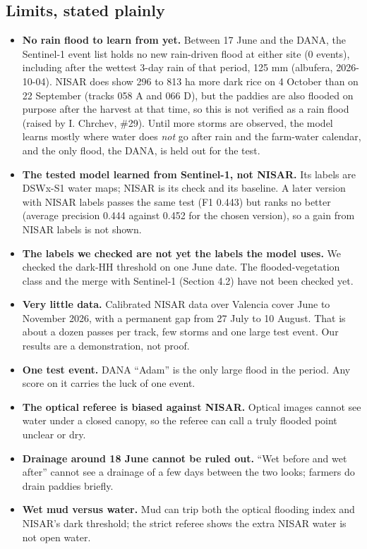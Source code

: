 \documentclass[10pt,twocolumn]{article}
\begin{document}
\subsection{Limits, stated plainly}
\begin{itemize}
\item{} \textbf{No rain flood to learn from yet.} Between 17 June and the DANA, the Sentinel-1 event list holds no new rain-driven flood at either site (0 events), including after the wettest 3-day rain of that period, 125 mm (albufera, 2026-10-04). NISAR does show 296 to 813 ha more dark rice on 4 October than on 22 September (tracks 058 A and 066 D), but the paddies are also flooded on purpose after the harvest at that time, so this is not verified as a rain flood (raised by I. Chrchev, \#29). Until more storms are observed, the model learns mostly where water does \emph{not} go after rain and the farm-water calendar, and the only flood, the DANA, is held out for the test.
\item{} \textbf{The tested model learned from Sentinel-1, not NISAR.} Its labels are DSWx-S1 water maps; NISAR is its check and its baseline. A later version with NISAR labels passes the same test (F1 0.443) but ranks no better (average precision 0.444 against 0.452 for the chosen version), so a gain from NISAR labels is not shown.
\item{} \textbf{The labels we checked are not yet the labels the model uses.} We checked the dark-HH threshold on one June date. The flooded-vegetation class and the merge with Sentinel-1 (Section 4.2) have not been checked yet.
\item{} \textbf{Very little data.} Calibrated NISAR data over Valencia cover June to November 2026, with a permanent gap from 27 July to 10 August. That is about a dozen passes per track, few storms and one large test event. Our results are a demonstration, not proof.
\item{} \textbf{One test event.} DANA ``Adam'' is the only large flood in the period. Any score on it carries the luck of one event.
\item{} \textbf{The optical referee is biased against NISAR.} Optical images cannot see water under a closed canopy, so the referee can call a truly flooded point unclear or dry.
\item{} \textbf{Drainage around 18 June cannot be ruled out.} ``Wet before and wet after'' cannot see a drainage of a few days between the two looks; farmers do drain paddies briefly.
\item{} \textbf{Wet mud versus water.} Mud can trip both the optical flooding index and NISAR's dark threshold; the strict referee shows the extra NISAR water is not open water.

\end{itemize}
\end{document}
